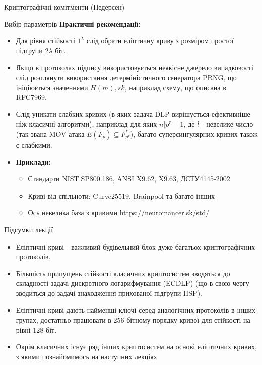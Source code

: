 \documentclass[9pt]{beamer}
\begin{document}
\begin{darkframes}
\begin{frame}{Криптографічні комітменти (Педерсен)}
\end{frame}

\begin{frame}{Вибір параметрів}
  \textbf{Практичні рекомендації:}
  \begin{itemize}
    \item Для рівня стійкості $1^\lambda$ слід обрати еліптичну криву з розміром простої підгрупи $2\lambda$ біт.
    \item Якщо в протоколах підпису використовується неякісне джерело випадковості слід розглянути використання детерміністичного генератора PRNG, що ініціюється значеннями $H(m), sk$, наприклад схему, що описана в RFC7969.
    \item Слід уникати слабких кривих (в яких задача DLP вирішується ефективніше ніж класичні алгоритми), наприклад для яких $n | p^r-1$, де $l$ - невелике число (так звана MOV-атака $E(F_p) \subseteq F^*_{p^r}$), багато суперсингулярних кривих також є слабкими. 
    \item \textbf{Приклади:}
      \begin{itemize}
        \item Стандарти NIST.SP800.186, ANSI X9.62, X9.63, ДСТУ4145-2002
        \item Криві від спільноти: Curve25519, Brainpool та багато інших
        \item Ось невелика база з кривими https://neuromancer.sk/std/
      \end{itemize}
  \end{itemize}

\end{frame}

\begin{frame}{Підсумки лекції}
  \begin{itemize}
    \item Еліптичні криві - важливий будівельний блок дуже багатьох криптографічних протоколів.
    \item Більшість припущень стійкості класичних криптосистем зводяться до складності задачі дискретного логарифмування (ECDLP) (що в свою чергу зводиться до задачі знаходження прихованої підгрупи HSP).
    \item Еліптичні криві дають найменші ключі серед аналогічних протоколів в інших групах, достатньо працювати в 256-бітному порядку кривої для стійкості на рівні 128 біт.
    \item Окрім класичних існує ряд інших криптосистем на основі еліптичних кривих, з якими познайомимось на наступних лекціях
  \end{itemize}
\end{frame}





  \end{darkframes}
\end{document}
